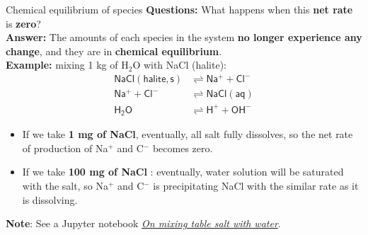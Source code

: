 \begin{frame}{Chemical equilibrium of species}
%
\alert{\textbf{Questions:}} What happens when this \textbf{net rate} is \alert{\textbf{zero}}? \\\textbf{Answer:} The amounts of each species in the system \textbf{no longer experience
any change}, and they are in \alert{\textbf{chemical equilibrium}}. \\[5pt]
%
\pause
\alert{\textbf{Example:}}
mixing 1 kg of H$_{2}$O with NaCl (halite):\\[-20pt] 
%
\begin{align*}
\mathsf{NaCl(halite, s)} & \rightleftharpoons\mathsf{Na^{+}+Cl^{-}}\\[-1pt]
\mathsf{Na^{+}+Cl^{-}} & \rightleftharpoons\mathsf{NaCl(aq)}\\[-1pt]
\mathsf{H_{2}O} & \rightleftharpoons\mathsf{H^{+}+OH^{-}}
\end{align*}
%
\vskip -5pt
\pause
\begin{itemize}
%
\item If we take \alert{\textbf{1 mg of NaCl}}, eventually, all salt fully dissolves, so the net rate of production of Na$^{+}$ and C$^-$ becomes zero.
%
\pause
\item If we take \alert{\textbf{100 mg of NaCl }}: eventually, water solution will be saturated with the salt, so Na$^{+}$ and C$^-$  is precipitating NaCl with the similar rate as it is dissolving.
\end{itemize}
\pause
\alert{\textbf{Note}}: See a Jupyter notebook \href{https://github.com/mtsveta/reaktoro-v2-workshop/blob/main/tutorials/solubility/solubility-tablesalt-water.ipynb}{\textcolor{indigo(dye)}{\it On mixing table salt with water}}.

\end{frame}
%
%
